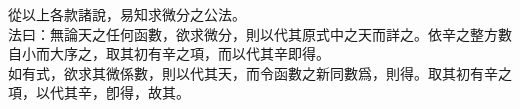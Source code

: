 \begin{enumerate} [label={第\chinese*款}]
	從以上各款諸說，易知求微分之公法。\\
	法曰：無論天之任何函數，欲求微分，則以\CJKmove 代其原式中之天而詳之。依辛之整方數自小而大序之，取其初有辛之項，而以\CJKmove 代其辛即得。\\
	如有式\CJKmove，欲求其微係數，則以\CJKmove 代其天，而令函數之新同數爲\CJKmove，則得\CJKmove。取其初有辛之項\CJKmove，以\CJKmove 代其辛，卽得\CJKmove，故其\CJKmove。\\
    
\end{enumerate}